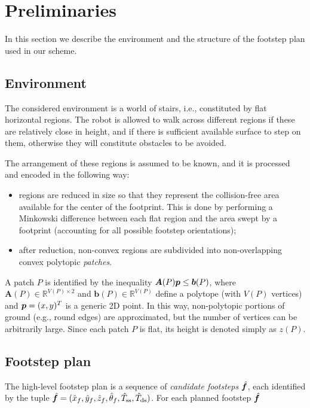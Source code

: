 \section{Preliminaries}
\label{sec:FAPA:Preliminaries}
In this section we describe the environment and the structure of the footstep
plan used in our scheme.

\subsection{Environment}
The considered environment is a world of stairs, i.e., constituted by flat
horizontal regions. The robot is allowed to walk across different regions if
these are relatively close in height, and if there is sufficient available
surface to step on them, otherwise they will constitute obstacles to be avoided.

The arrangement of these regions is assumed to be known, and it is processed
and encoded in the following way:
\begin{itemize}
    \item regions are reduced in size so that they represent the collision-free
        area available for the center of the footprint. This is done by
        performing a Minkowski difference between each flat region and the
        area swept by a footprint (accounting for all possible footstep orientations);
    \item after reduction, non-convex regions are subdivided into
        non-overlapping convex polytopic {\em patches}.
\end{itemize}
A patch $P$ is identified by the inequality ${\bm{A}}(P) {\bm{p}} \le {\bm{b}}(P)$,
where $\bm{A}(P) \in \mathbb{R}^{V(P) \times 2}$ and
$\bm{b}(P) \in \mathbb{R}^{V(P)} $ define a polytope (with $V(P)$ vertices)
and ${\bm{p}} = (x, y)^T$ is a generic 2D point. 
In this way, non-polytopic portions of ground (e.g., round edges) are
approximated, but the number of vertices can be arbitrarily large.
Since each patch $P$ is flat, its height is denoted simply as $z(P)$.

\subsection{Footstep plan}
The high-level footstep plan is a sequence of {\em candidate footsteps}
$\hat{{\bm{f}}}$, each identified by the tuple
$\hat{{\bm{f}}} = (\hat x_f, \hat y_f, \hat z_f, \hat\theta_f, \hat T_{\rm ss}, \hat T_{\rm ds})$.
For each planned footstep $\hat{{\bm{f}}}$

